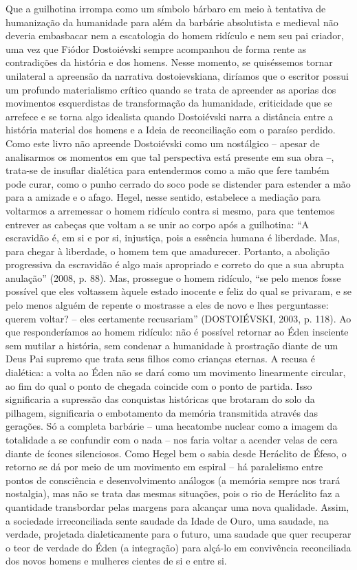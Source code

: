 Que a guilhotina irrompa como um símbolo bárbaro em meio à tentativa de
humanização da humanidade para além da barbárie absolutista e medieval
não deveria embasbacar nem a escatologia do homem ridículo e nem seu pai
criador, uma vez que Fiódor Dostoiévski sempre acompanhou de forma rente
as contradições da história e dos homens. Nesse momento, se quiséssemos
tornar unilateral a apreensão da narrativa dostoievskiana, diríamos que
o escritor possui um profundo materialismo crítico quando se trata de
apreender as aporias dos movimentos esquerdistas de transformação da
humanidade, criticidade que se arrefece e se torna algo idealista quando
Dostoiévski narra a distância entre a história material dos homens e a
Ideia de reconciliação com o paraíso perdido. Como este livro não
apreende Dostoiévski como um nostálgico -- apesar de analisarmos os
momentos em que tal perspectiva está presente em sua obra --, trata-se
de insuflar dialética para entendermos como a mão que fere também pode
curar, como o punho cerrado do soco pode se distender para estender a
mão para a amizade e o afago. Hegel, nesse sentido, estabelece a
mediação para voltarmos a arremessar o homem ridículo contra si mesmo,
para que tentemos entrever as cabeças que voltam a se unir ao corpo após
a guilhotina: ``A escravidão é, em si e por si, injustiça, pois a
essência humana é liberdade. Mas, para chegar à liberdade, o homem tem
que amadurecer. Portanto, a abolição progressiva da escravidão é algo
mais apropriado e correto do que a sua abrupta anulação'' (2008, p. 88).
Mas, prossegue o homem ridículo, ``se pelo menos fosse possível que eles
voltassem àquele estado inocente e feliz do qual se privaram, e se pelo
menos alguém de repente o mostrasse a eles de novo e lhes perguntasse:
querem voltar? -- eles certamente recusariam'' (DOSTOIÉVSKI, 2003, p.
118). Ao que responderíamos ao homem ridículo: não é possível retornar
ao Éden insciente sem mutilar a história, sem condenar a humanidade à
prostração diante de um Deus Pai supremo que trata seus filhos como
crianças eternas. A recusa é dialética: a volta ao Éden não se dará como
um movimento linearmente circular, ao fim do qual o ponto de chegada
coincide com o ponto de partida. Isso significaria a supressão das
conquistas históricas que brotaram do solo da pilhagem, significaria o
embotamento da memória transmitida através das gerações. Só a completa
barbárie -- uma hecatombe nuclear como a imagem da totalidade a se
confundir com o nada -- nos faria voltar a acender velas de cera diante
de ícones silenciosos. Como Hegel bem o sabia desde Heráclito de Éfeso,
o retorno se dá por meio de um movimento em espiral -- há paralelismo
entre pontos de consciência e desenvolvimento análogos (a memória sempre
nos trará nostalgia), mas não se trata das mesmas situações, pois o rio
de Heráclito faz a quantidade transbordar pelas margens para alcançar
uma nova qualidade. Assim, a sociedade irreconciliada sente saudade da
Idade de Ouro, uma saudade, na verdade, projetada dialeticamente para o
futuro, uma saudade que quer recuperar o teor de verdade do Éden (a
integração) para alçá-lo em convivência reconciliada dos novos homens e
mulheres cientes de si e entre si.

